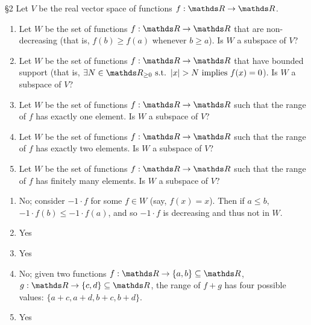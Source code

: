 \documentclass{review-sheet}
\begin{document}
\begin{problem}{\S 2}
  Let $V$ be the real vector space of functions $f: \R \to \R$.
  \begin{enumerate}
    \item Let $W$ be the set of functions $f:\R\to \R$ that are non-decreasing (that is, $f(b)\ge
      f(a)$ whenever $b\ge a$). Is $W$ a subspace of  $V$?
    \item Let $W$ be the set of functions $f: \R \to \R$ that have bounded support (that is,
      $\exists N\in \R_{\ge 0} ~\text{s.t.}~ \left| x \right| > N ~\text{implies}~f(x)=0$). Is $W$ a
      subspace of $V$?
    \item Let $W$ be the set of functions $f:\R\to \R$ such that the range of $f$ has exactly one
      element. Is $W$ a subspace of $V$?
    \item Let $W$ be the set of functions $f:\R\to \R$ such that the range of $f$ has exactly two
      elements. Is $W$ a subspace of $V$?
    \item Let $W$ be the set of functions $f:\R\to \R$ such that the range of $f$ has finitely many
      elements. Is $W$ a subspace of $V$?
  \end{enumerate}
\end{problem}
\clearpage
\begin{solution}
  \begin{enumerate}
    \item No; consider $-1\cdot f$ for some $f\in W$ (say, $f(x)=x$). Then if $a\le b$, $-1\cdot f(b)\le
      -1\cdot f(a)$, and so $-1\cdot f$ is decreasing and thus not in $W$.
    \item Yes
    \item Yes
    \item No; given two functions $f: \R \to \{ a,b \}\subseteq \R$, $g:\R\to \{ c,d \}\subseteq
      \R$, the range of $f+g$ has four possible values:  $\{ a+c,a+d,b+c,b+d \}$.
    \item Yes
  \end{enumerate}
\end{solution}
\end{document}
